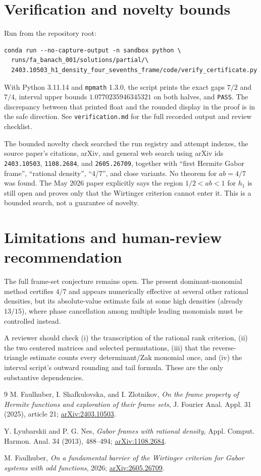 \documentclass[11pt]{article}
\begin{document}
\section{Verification and novelty bounds}
Run from the repository root:
\begin{verbatim}
conda run --no-capture-output -n sandbox python \
  runs/fa_banach_001/solutions/partial/\
  2403.10503_h1_density_four_sevenths_frame/code/verify_certificate.py
\end{verbatim}
With Python 3.11.14 and \texttt{mpmath} 1.3.0, the script prints the exact
gaps $7/2$ and $7/4$, interval upper bounds
$1.0770235946345321$ on both halves, and \texttt{PASS}.  The discrepancy
between that printed float and the rounded display in the proof is in the
safe direction.  See \texttt{verification.md} for the full recorded output
and review checklist.

The bounded novelty check searched the run registry and attempt indexes, the
source paper's citations, arXiv, and general web search using arXiv ids
\texttt{2403.10503}, \texttt{1108.2684}, and \texttt{2605.26709}, together
with ``first Hermite Gabor frame'', ``rational density'', ``4/7'', and close
variants.  No theorem for $ab=4/7$ was found.  The May 2026 paper
\cite{F26} explicitly says the region $1/2<ab<1$ for $h_1$ is still open and
proves only that the Wirtinger criterion cannot enter it.  This is a bounded
search, not a guarantee of novelty.

\section{Limitations and human-review recommendation}
The full frame-set conjecture remains open.  The present dominant-monomial
method certifies $4/7$ and appears numerically effective at several other
rational densities, but its absolute-value estimate fails at some high
densities (already $13/15$), where phase cancellation among multiple leading
monomials must be controlled instead.

A reviewer should check (i) the transcription of the rational rank criterion,
(ii) the two centered matrices and selected permutations, (iii) that the
reverse-triangle estimate counts every determinant/Zak monomial once, and
(iv) the interval script's outward rounding and tail formula.  These are the
only substantive dependencies.

\begin{thebibliography}{9}
M. Faulhuber, I. Shafkulovska, and I. Zlotnikov,
\emph{On the frame property of Hermite functions and exploration of their
frame sets}, J. Fourier Anal. Appl. 31 (2025), article 21;
\href{https://arxiv.org/abs/2403.10503}{arXiv:2403.10503}.

Y. Lyubarskii and P. G. Nes,
\emph{Gabor frames with rational density},
Appl. Comput. Harmon. Anal. 34 (2013), 488--494;
\href{https://arxiv.org/abs/1108.2684}{arXiv:1108.2684}.

M. Faulhuber,
\emph{On a fundamental barrier of the Wirtinger criterion for Gabor systems
with odd functions}, 2026;
\href{https://arxiv.org/abs/2605.26709}{arXiv:2605.26709}.
\end{thebibliography}
\end{document}
